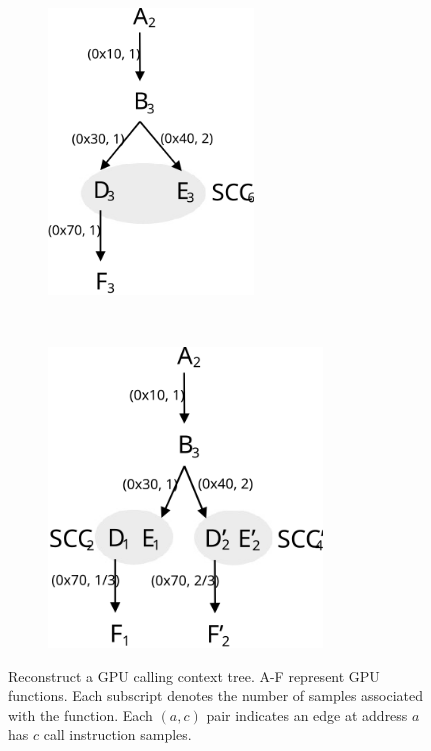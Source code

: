\begin{figure}[t]
~
\begin{subfigure}{0.22\textwidth}
\centering
\includegraphics[width=0.6\textwidth]{fig/cct-3.svg}
\caption{}
\end{subfigure}
~
\begin{subfigure}{0.22\textwidth}
\centering
\includegraphics[width=0.8\textwidth]{fig/cct-4.svg}
\caption{}
\end{subfigure}
\caption{Reconstruct a GPU calling context tree. A-F represent GPU functions. Each subscript denotes the number of samples associated with the function. Each $(a, c)$ pair indicates an edge at address $a$ has $c$ call instruction samples.}
\label{fig:gpu calling context tree}
\end{figure}

